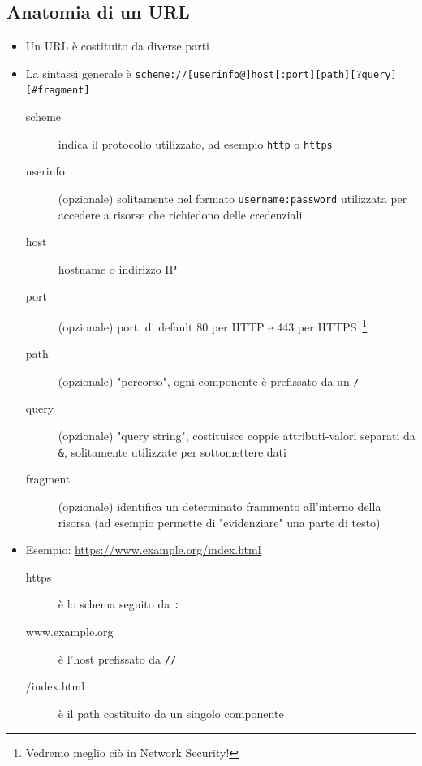 \documentclass{beamer}
\newcommand{\code}[1]{\mbox{\texttt{#1}}}
\begin{document}
\subsection*{Anatomia di un URL}
\begin{frame}[allowframebreaks]{\insertsection}{\insertsubsection}
\begin{itemize}
\item Un \alert{URL} è costituito da diverse parti
\item La sintassi generale è
\small{\code{scheme://[userinfo@]host[:port][path][?query][\#fragment]}}
\begin{description}
\item[scheme] indica il protocollo utilizzato, ad esempio \code{http} o
\code{https}
\item[userinfo] (opzionale) solitamente nel formato
\code{username:password} utilizzata per accedere a risorse che richiedono delle
credenziali
\item[host] hostname o indirizzo IP
\item[port] (opzionale) port, di default 80 per HTTP e 443 per
HTTPS~\footnote{Vedremo meglio ciò in Network Security!}
\item[path] (opzionale) "percorso", ogni componente è prefissato da un \code{/}
\item[query] (opzionale) "query string", costituisce coppie attributi-valori
separati da \code{\&}, solitamente utilizzate per sottomettere dati
\item[fragment] (opzionale) identifica un determinato frammento all'interno
della risorsa (ad esempio permette di "evidenziare" una parte di testo)
\end{description}
\item Esempio: \url{https://www.example.org/index.html}
\begin{description}
\item[https] è lo \alert{schema} seguito da \code{:}
\item[www.example.org] è l'\alert{host} prefissato da \code{//}
\item[/index.html] è il \alert{path} costituito da un singolo componente
\end{description}
\end{itemize}
\end{frame}
\end{document}

